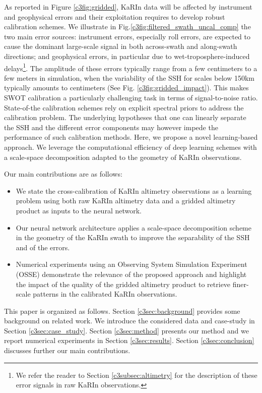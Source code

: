 \begin{bibunit}
As reported in Figure \ref{c3fig:gridded}, KaRIn data will be affected by instrument and geophysical errors  \cite{ubelmann_swot_nodate} and their exploitation requires to develop robust calibration schemes. We illustrate in Fig.\ref{c3fig:filtered_swath_uncal_comp} the two main error sources: instrument errors, especially roll errors, are expected to cause the dominant large-scale signal in both across-swath and along-swath directions; and geophysical errors, in particular due to wet-troposphere-induced delays\footnote{We refer the reader to Section \ref{c3subsec:altimetry} for the description of these error signals in raw KaRIn observations.}.
The amplitude of these errors typically range from a few centimeters to a few meters in simulation, when the variability of the SSH for scales below 150km typically amounts to centimeters (See Fig. \ref{c3fig:gridded_impact}). This makes SWOT calibration a particularly challenging task in terms of signal-to-noise ratio. State-of-the calibration schemes \cite{Dibarboure_Ubelmann_Flamant_Briol_Peral_Bracher_Vergara_Faugere_Soulat_Picot_2022} rely on explicit spectral priors to address the calibration problem. 
The underlying hypotheses that one can linearly separate the SSH and the different error components may however impede the performance of such calibration methods. Here, we propose a novel learning-based approach. 
We leverage the computational efficiency of deep learning schemes with a scale-space decomposition \cite{Witkin_1984} adapted to the geometry of KaRIn observations. 

Our main contributions are as follows:
\begin{itemize}
\item{We state the cross-calibration of KaRIn altimetry observations as a learning problem using both raw KaRIn altimetry data and a gridded altimetry product as inputs to the neural network.}
\item{Our neural network architecture applies a scale-space decomposition scheme in the geometry of the KaRIn swath to improve the separability of the SSH and of the errors.}
\item{Numerical experiments using an Observing System Simulation Experiment (OSSE) demonstrate the relevance of the proposed approach and highlight the impact of the quality of the gridded altimetry product to retrieve finer-scale patterns in the calibrated KaRIn observations.}
\end{itemize}
This paper is organized as follows. Section \ref{c3sec:background} provides some background on related work. We introduce the considered data and case-study in Section \ref{c3sec:case_study}. 
Section \ref{c3sec:method} presents our method and we report numerical experiments in Section \ref{c3sec:results}. 
Section \ref{c3sec:conclusion} discusses further our main contributions.


\end{bibunit}
